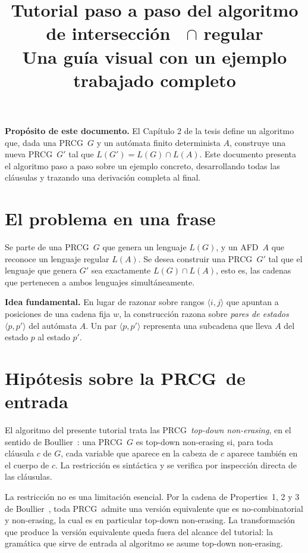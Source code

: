 \documentclass[11pt, letterpaper]{article}
\title{\textbf{Tutorial paso a paso del algoritmo de intersección \PRCG\ $\cap$ regular} \\[0.4em]
\large Una guía visual con un ejemplo trabajado completo}
\author{}
\date{}
\theoremstyle{definition}
\newcommand{\PRCG}{\mbox{PRCG}}
\newcommand{\AFD}{\mbox{AFD}}
\begin{document}
\maketitle
\thispagestyle{empty}

\begin{tcolorbox}
\textbf{Propósito de este documento.} El Capítulo 2 de la tesis define un algoritmo que, dada una \PRCG\ $G$ y un autómata finito determinista $A$, construye una nueva \PRCG\ $G'$ tal que $L(G') = L(G) \cap L(A)$. Este documento presenta el algoritmo paso a paso sobre un ejemplo concreto, desarrollando todas las cláusulas y trazando una derivación completa al final.
\end{tcolorbox}

\section{El problema en una frase}

Se parte de una \PRCG\ $G$ que genera un lenguaje $L(G)$, y un \AFD\ $A$ que reconoce un lenguaje regular $L(A)$. Se desea construir una \PRCG\ $G'$ tal que el lenguaje que genera $G'$ sea exactamente $L(G) \cap L(A)$, esto es, las cadenas que pertenecen a ambos lenguajes simultáneamente.

\begin{tcolorbox}
\textbf{Idea fundamental.} En lugar de razonar sobre rangos $\langle i, j \rangle$ que apuntan a posiciones de una cadena fija $w$, la construcción razona sobre \emph{pares de estados} $\langle p, p' \rangle$ del autómata $A$. Un par $\langle p, p' \rangle$ representa una subcadena que lleva $A$ del estado $p$ al estado $p'$.
\end{tcolorbox}

\section{Hipótesis sobre la \PRCG\ de entrada}

El algoritmo del presente tutorial trata las \PRCG\ \emph{top-down non-erasing}, en el sentido de Boullier~\cite{REF}: una \PRCG\ $G$ es top-down non-erasing si, para toda cláusula $c$ de $G$, cada variable que aparece en la cabeza de $c$ aparece también en el cuerpo de $c$. La restricción es sintáctica y se verifica por inspección directa de las cláusulas.

La restricción no es una limitación esencial. Por la cadena de Properties~1, 2 y 3 de Boullier~\cite{REF}, toda \PRCG\ admite una versión equivalente que es no-combinatorial y non-erasing, la cual es en particular top-down non-erasing. La transformación que produce la versión equivalente queda fuera del alcance del tutorial: la gramática que sirve de entrada al algoritmo se asume top-down non-erasing.
\end{document}
